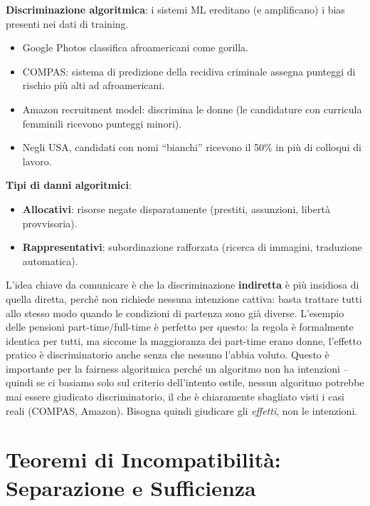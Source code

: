 \documentclass[a4paper,11pt]{article}
\begin{document}
\textbf{Discriminazione algoritmica}: i sistemi ML ereditano (e amplificano) i bias presenti nei dati di training.
\begin{itemize}
  \item Google Photos classifica afroamericani come gorilla.
  \item COMPAS: sistema di predizione della recidiva criminale assegna punteggi di rischio pi\`{u} alti ad afroamericani.
  \item Amazon recruitment model: discrimina le donne (le candidature con curricula femminili ricevono punteggi minori).
  \item Negli USA, candidati con nomi ``bianchi'' ricevono il 50\% in pi\`{u} di colloqui di lavoro.
\end{itemize}

\textbf{Tipi di danni algoritmici}:
\begin{itemize}
  \item \textbf{Allocativi}: risorse negate disparatamente (prestiti, assunzioni, libert\`{a} provvisoria).
  \item \textbf{Rappresentativi}: subordinazione rafforzata (ricerca di immagini, traduzione automatica).
\end{itemize}

\begin{nota}
L'idea chiave da comunicare \`{e} che la discriminazione \textbf{indiretta} \`{e} pi\`{u} insidiosa di quella diretta, perch\'{e} non richiede nessuna intenzione cattiva: basta trattare tutti allo stesso modo quando le condizioni di partenza sono gi\`{a} diverse. L'esempio delle pensioni part-time/full-time \`{e} perfetto per questo: la regola \`{e} formalmente identica per tutti, ma siccome la maggioranza dei part-time erano donne, l'effetto pratico \`{e} discriminatorio anche senza che nessuno l'abbia voluto. Questo \`{e} importante per la fairness algoritmica perch\'{e} un algoritmo non ha intenzioni -- quindi se ci basiamo solo sul criterio dell'intento ostile, nessun algoritmo potrebbe mai essere giudicato discriminatorio, il che \`{e} chiaramente sbagliato visti i casi reali (COMPAS, Amazon). Bisogna quindi giudicare gli \emph{effetti}, non le intenzioni.
\end{nota}

\section{Teoremi di Incompatibilit\`{a}: Separazione e Sufficienza}
\end{document}
